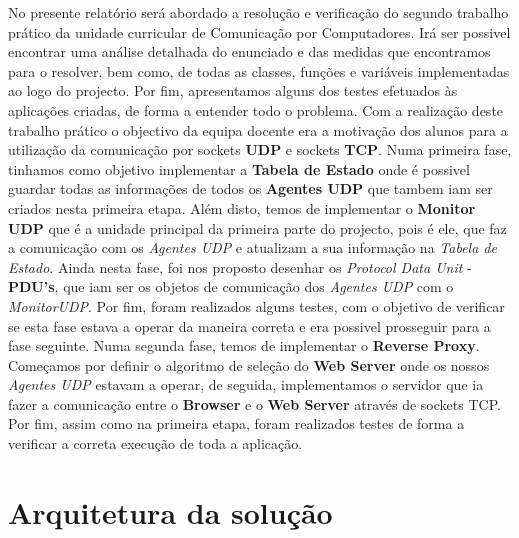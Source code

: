 \documentclass{llncs}
\begin{document}
No presente relatório será abordado a resolução e verificação do segundo trabalho prático da unidade curricular de Comunicação por Computadores. Irá ser possivel encontrar uma análise detalhada do enunciado e das medidas que encontramos para o resolver, bem como, de todas as classes, funções e variáveis implementadas ao logo do projecto. Por fim, apresentamos alguns dos testes efetuados às aplicações criadas, de forma a entender todo o problema.
Com a realização deste trabalho prático o objectivo da equipa docente era a motivação dos alunos para a utilização da comunicação por sockets \textbf{UDP} e sockets \textbf{TCP}.
Numa primeira fase, tinhamos como objetivo implementar a \textbf{Tabela de Estado} onde é possivel guardar todas as informações de todos os \textbf{Agentes UDP} que tambem iam ser criados nesta primeira etapa. Além disto, temos de implementar o \textbf{Monitor UDP} que é a unidade principal da primeira parte do projecto, pois é ele, que faz a comunicação com os \textit{Agentes UDP} e atualizam a sua informação na \textit{Tabela de Estado}. Ainda nesta fase, foi nos proposto desenhar os \textit{Protocol Data Unit} - \textbf{PDU's}, que iam ser os objetos de comunicação dos \textit{Agentes UDP} com o \textit{MonitorUDP}. Por fim, foram realizados alguns testes, com o objetivo de verificar se esta fase estava a operar da maneira correta e era possivel prosseguir para a fase seguinte.
Numa segunda fase, temos de implementar o \textbf{Reverse Proxy}. Começamos por definir o algoritmo de seleção do \textbf{Web Server} onde os nossos \textit{Agentes UDP} estavam a operar, de seguida, implementamos o servidor que ia fazer a comunicação entre o \textbf{Browser} e o \textbf{Web Server} através de sockets TCP. Por fim, assim como na primeira etapa, foram realizados testes de forma a verificar a correta execução de toda a aplicação.


\section{Arquitetura da solução}
\end{document}

